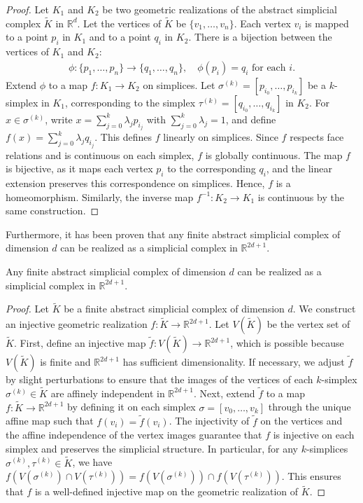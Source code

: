 \begin{proof}
Let $K_1$ and $K_2$ be two geometric realizations of the abstract simplicial complex $\tilde{K}$ in $\mathbb{R}^d$. Let the vertices of $\tilde{K}$ be $\{v_1, \dots, v_n\}$. Each vertex $v_i$ is mapped to a point $p_i$ in $K_1$ and to a point $q_i$ in $K_2$. There is a bijection between the vertices of $K_1$ and $K_2$: 
\begin{align}
\phi: \{p_1, \dots, p_n\} \to \{q_1, \dots, q_n\}, \quad \phi(p_i) = q_i \text{ for each } i.
\end{align}
Extend $\phi$ to a map $f: K_1 \to K_2$ on simplices. Let $\sigma^{(k)} = [p_{i_0}, \dots, p_{i_{k}}]$ be a $k$-simplex in $K_1$, corresponding to the simplex $\tau^{(k)} = [q_{i_0}, \dots, q_{i_{k}}]$ in $K_2$. For $x \in \sigma^{(k)}$, write $x = \sum_{j=0}^{k} \lambda_j p_{i_j}$ with $\sum_{j=0}^{k} \lambda_j = 1$, and define $f(x) = \sum_{j=0}^{k} \lambda_j q_{i_j}$. This defines $f$ linearly on simplices. Since $f$ respects face relations and is continuous on each simplex, $f$ is globally continuous. The map $f$ is bijective, as it maps each vertex $p_i$ to the corresponding $q_i$, and the linear extension preserves this correspondence on simplices. Hence, $f$ is a homeomorphism. Similarly, the inverse map $f^{-1}: K_2 \to K_1$ is continuous by the same construction.
\end{proof}

Furthermore, it has been proven that any finite abstract simplicial complex of dimension
$d$ can be realized as a simplicial complex in $\mathbb{R}^{2d+1}$.

\begin{theorem}
Any finite abstract simplicial complex of dimension $d$ can be realized as a simplicial complex in $\mathbb{R}^{2d+1}$.
\end{theorem}

\begin{proof}
Let $\tilde{K}$ be a finite abstract simplicial complex of dimension $d$. We construct an injective geometric realization $f: \tilde{K} \to \mathbb{R}^{2d+1}$.  Let $V(\tilde{K})$ be the vertex set of $\tilde{K}$. First, define an injective map $\tilde{f}: V(\tilde{K}) \to \mathbb{R}^{2d+1}$, which is possible because $V(\tilde{K})$ is finite and $\mathbb{R}^{2d+1}$ has sufficient dimensionality. If necessary, we adjust $\tilde{f}$ by slight perturbations to ensure that the images of the vertices of each $k$-simplex $\sigma^{(k)} \in \tilde{K}$ are affinely independent in $\mathbb{R}^{2d+1}$. Next, extend $\tilde{f}$ to a map $f: \tilde{K} \to \mathbb{R}^{2d+1}$ by defining it on each simplex $\sigma = [v_0, \dots, v_k]$ through the unique affine map such that $f(v_i) = \tilde{f}(v_i)$. The injectivity of $\tilde{f}$ on the vertices and the affine independence of the vertex images guarantee that $f$ is injective on each simplex and preserves the simplicial structure. In particular, for any $k$-simplices $\sigma^{(k)}, \tau^{(k)} \in \tilde{K}$, we have $f(V(\sigma^{(k)}) \cap V(\tau^{(k)})) = f(V(\sigma^{(k)})) \cap f(V(\tau^{(k)}))$. This ensures that $f$ is a well-defined injective map on the geometric realization of $\tilde{K}$.
\end{proof}

